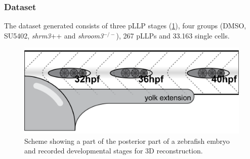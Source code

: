 \documentclass[10pt, b5paper, singlespacinge, twoside]{reedthesis} %
\theoremstyle{definition}
\theoremstyle{definition}
\theoremstyle{definition}
\theoremstyle{remark}
\begin{document}
\hypertarget{dataset-1}{%
\subsubsection{Dataset}\label{dataset-1}}

The dataset generated consists of three pLLP stages (\ref{fig:acstages}), four groups (DMSO, SU5402, \emph{shrm3}++ and \emph{shroom3}\(^{-/-}\)), 267 pLLPs and 33.163 single cells.\newline


\begin{figure}[H]

{\centering \includegraphics[width=0.6\linewidth]{figures/results/04_constriction/Yolk_ext} 

}

\caption[Recorded developmental stages for 3D reconstruction]{Scheme showing a part of the posterior part of a zebrafish embryo and recorded developmental stages for 3D reconstruction.}\label{fig:acstages}
\end{figure}
\end{document}
